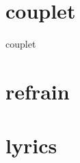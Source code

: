 \documentclass[11pt]{article}
\begin{document}
    \makesongtitle
    \section*{couplet}

    {couplet}
    \section*{refrain}


    \newpage


    \section*{lyrics}
    \begin{multicols}{2}
        
    \end{multicols}
\end{document}
